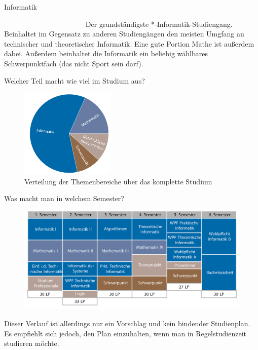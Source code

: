 	\begin{Huge}
			Informatik
		\end{Huge}
		\begin{exampleblock}{\textcolor{white}{Was ist der Studiengang?}}
			Der grundständigste *-Informatik-Studiengang. Beinhaltet im Gegensatz zu anderen Studiengängen den meisten Umgfang an technischer und theoretischer Informatik. Eine gute Portion Mathe ist außerdem dabei. Außerdem beinhaltet die Informatik ein beliebig wählbares Schwerpunktfach (das nicht Sport sein darf).
		\end{exampleblock}
	
	\begin{block}{Welcher Teil macht wie viel im Studium aus?}
		\begin{figure}[h!]
			\includegraphics[width=0.4\textwidth]{charts/informatik-Piechart.pdf}
			\caption{Verteilung der Themenbereiche über das komplette Studium}
		\end{figure}
	\end{block}
	
	\begin{block}{Was macht man in welchem Semester?}
		\begin{figure}[h!]
			\includegraphics[width=\textwidth]{charts/informatik-Studienplan_abWS18.pdf}
		\end{figure}
		Dieser Verlauf ist allerdings nur ein Vorschlag und kein bindender Studienplan. Es empfiehlt sich jedoch, den Plan einzuhalten, wenn man in Regelstudienzeit studieren möchte.
	\end{block}

